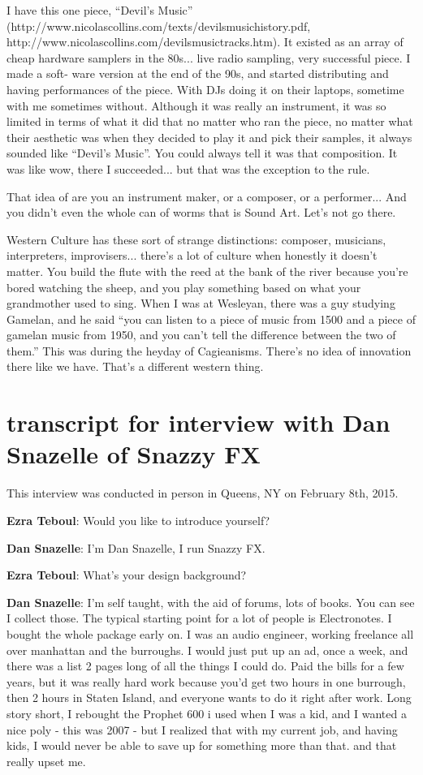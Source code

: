 I have this one piece, ``Devil’s Music'' (http://www.nicolascollins.com/texts/devilsmusichistory.pdf, http://www.nicolascollins.com/devilsmusictracks.htm). It existed as an array of cheap hardware samplers in the 80s... live radio sampling, very successful piece. I made a soft- ware version at the end of the 90s, and started distributing and having performances of the piece. With DJs doing it on their laptops, sometime with me sometimes without. Although it was really an instrument, it was so limited in terms of what it did that no matter who ran the piece, no matter what their aesthetic was when they decided to play it and pick their samples, it always sounded like ``Devil’s Music''. You could always tell it was that composition. It was like wow, there I succeeded... but that was the exception to the rule.
					
That idea of are you an instrument maker, or a composer, or a performer... And you didn’t even the whole can of worms that is Sound Art. Let’s not go there.
					
Western Culture has these sort of strange distinctions: composer, musicians, interpreters, improvisers... there’s a lot of culture when honestly it doesn’t matter. You build the flute with the reed at the bank of the river because you’re bored watching the sheep, and you play something based on what your grandmother used to sing. When I was at Wesleyan, there was a guy studying Gamelan, and he said ``you can listen to a piece of music from 1500 and a piece of gamelan music from 1950, and you can’t tell the difference between the two of them.'' This was during the heyday of Cagieanisms. There’s no idea of innovation there like we have. That’s a different western thing. 

\newpage

\clearpage 
\section{transcript for interview with Dan Snazelle of Snazzy FX}
This interview was conducted in person in Queens, NY on February 8th, 2015. 

\textbf{Ezra Teboul}: Would you like to introduce yourself? 

\textbf{Dan Snazelle}: I'm Dan Snazelle, I run Snazzy FX.

\textbf{Ezra Teboul}: What's your design background? 

\textbf{Dan Snazelle}: I'm self taught, with the aid of forums, lots of books. You can see I collect those. The typical starting point for a lot of people is Electronotes. I bought the whole package early on. I was an audio engineer, working freelance all over manhattan and the burroughs. I would just put up an ad, once a week, and there was a list 2 pages long of all the things I could do. Paid the bills for a few years, but it was really hard work because you'd get two hours in one burrough, then 2 hours in Staten Island, and everyone wants to do it right after work. Long story short, I rebought the Prophet 600 i used when I was a kid, and I wanted a nice poly - this was 2007 - but I realized that with my current job, and having kids, I would never be able to save up for something more than that. and that really upset me. 

